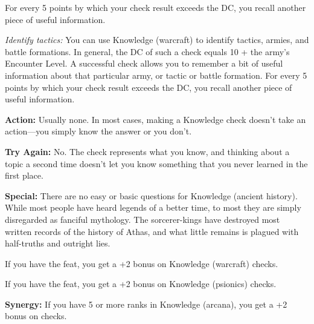 For every 5 points by which your check result exceeds the DC, you recall another piece of useful information.

\textit{Identify tactics:} You can use Knowledge (warcraft) to identify tactics, armies, and battle formations. In general, the DC of such a check equals 10 + the army's Encounter Level. A successful check allows you to remember a bit of useful information about that particular army, or tactic or battle formation. For every 5 points by which your check result exceeds the DC, you recall another piece of useful information.




\textbf{Action:} Usually none. %
In most cases, making a Knowledge check doesn't take an action---you simply know the answer or you don't.

\textbf{Try Again:} No. The check represents what you know, and thinking about a topic a second time doesn't let you know something that you never learned in the first place.

\textbf{Special:} There are no easy or basic questions for Knowledge (ancient history). While most people have heard legends of a better time, to most they are simply disregarded as fanciful mythology. The sorcerer-kings have destroyed most written records of the history of Athas, and what little remains is plagued with half-truths and outright lies.

If you have the  feat, you get a +2 bonus on Knowledge (warcraft) checks.

If you have the  feat, you get a +2 bonus on Knowledge (psionics) checks.

\textbf{Synergy:} If you have 5 or more ranks in Knowledge (arcana), you get a +2 bonus on  checks.

